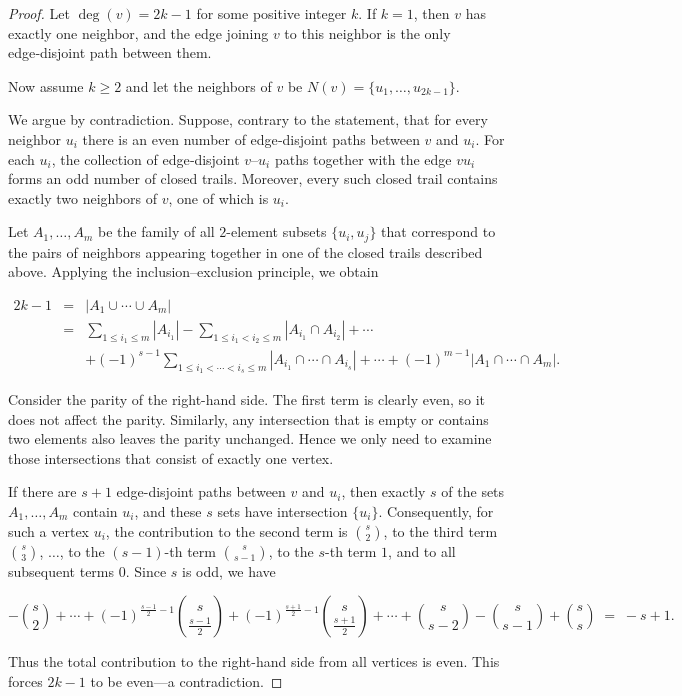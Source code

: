 \documentclass{article}
\begin{document}
\begin{proof}
Let $\deg(v) = 2k-1$ for some positive integer $k$.  
If $k=1$, then $v$ has exactly one neighbor, and the edge joining $v$ to this neighbor is the only edge‑disjoint path between them.  

Now assume $k \ge 2$ and let the neighbors of $v$ be $N(v) = \{u_1, \dots, u_{2k-1}\}$.

We argue by contradiction. Suppose, contrary to the statement, that for every neighbor $u_i$ there is an even number of edge‑disjoint paths between $v$ and $u_i$. For each $u_i$, the collection of edge‑disjoint $v$–$u_i$ paths together with the edge $vu_i$ forms an odd number of closed trails. Moreover, every such closed trail contains exactly two neighbors of $v$, one of which is $u_i$.  

Let $A_1, \dots, A_m$ be the family of all $2$-element subsets $\{u_i, u_j\}$ that correspond to the pairs of neighbors appearing together in one of the closed trails described above. Applying the inclusion–exclusion principle, we obtain

\begin{eqnarray*}
2k-1 &=& |A_1\cup\cdots\cup A_m| \\
&=&\sum_{1\leq i_1\leq m} |A_{i_1}|
   - \sum_{1\leq i_1<i_2\leq m} |A_{i_1}\cap A_{i_2}|
   + \cdots \\
&&+ (-1)^{s-1} \sum_{1\leq i_1<\cdots<i_s\leq m} |A_{i_1}\cap\cdots\cap A_{i_s}|
   + \cdots
   + (-1)^{m-1}|A_{1}\cap\cdots\cap A_{m}|.
\end{eqnarray*}

Consider the parity of the right-hand side. The first term is clearly even, so it does not affect the parity. Similarly, any intersection that is empty or contains two elements also leaves the parity unchanged. Hence we only need to examine those intersections that consist of exactly one vertex.

If there are \(s+1\) edge-disjoint paths between \(v\) and \(u_i\), then exactly \(s\) of the sets \(A_1,\dots,A_m\) contain \(u_i\), and these \(s\) sets have intersection \(\{u_i\}\). Consequently, for such a vertex $u_i$, the contribution to the second term is $\binom{s}{2}$, to the third term $\binom{s}{3}$, $\dots$, to the $(s-1)$-th term $\binom{s}{s-1}$, to the $s$-th term $1$, and to all subsequent terms $0$. Since $s$ is odd, we have

\[
-\binom{s}{2} + \cdots + (-1)^{\frac{s-1}{2}-1}\binom{s}{\frac{s-1}{2}} +(-1)^{\frac{s+1}{2}-1}\binom{s}{\frac{s+1}{2}}+ \cdots +\binom{s}{s-2}- \binom{s}{s-1} + \binom{s}{s} \;=\; -s + 1.
\]

Thus the total contribution to the right-hand side from all vertices is even. This forces $2k-1$ to be even—a contradiction.

\end{proof}
\end{document}
